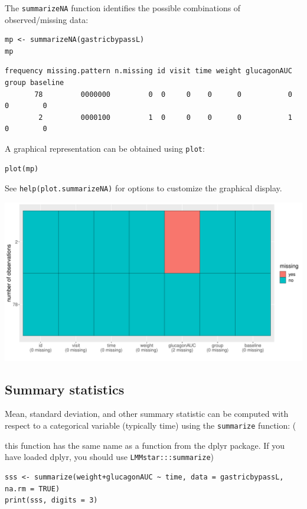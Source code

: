 \documentclass[12pt]{article}
\newcommand\Warning[1][3ex]{%
\renewcommand\stacktype{L}%
\scaleto{\stackon[1.3pt]{\color{red}$\triangle$}{\tiny\bfseries !}}{#1}%
\xspace
}
\begin{document}
The \texttt{summarizeNA} function identifies the possible combinations of
observed/missing data:
\lstset{language=r,label= ,caption= ,captionpos=b,numbers=none}
\begin{lstlisting}
mp <- summarizeNA(gastricbypassL)
mp
\end{lstlisting}

\begin{verbatim}
frequency missing.pattern n.missing id visit time weight glucagonAUC group baseline
       78         0000000         0  0     0    0      0           0     0        0
        2         0000100         1  0     0    0      0           1     0        0
\end{verbatim}


A graphical representation can be obtained using \texttt{plot}:
\lstset{language=r,label= ,caption= ,captionpos=b,numbers=none}
\begin{lstlisting}
plot(mp)
\end{lstlisting}

See \texttt{help(plot.summarizeNA)} for options to customize the graphical
display.

\begin{center}
\includegraphics[trim={0 0 0 0},width=1\textwidth]{./figures/summarizeNA.pdf}
\end{center}



\clearpage

\subsection{Summary statistics}
\label{sec:org4ef97bf}

Mean, standard deviation, and other summary statistic can be computed
with respect to a categorical variable (typically time) using the
\texttt{summarize} function: \newline (\Warning this function has the same
name as a function from the dplyr package. If you have loaded dplyr,
you should use \texttt{LMMstar:::summarize})
\lstset{language=r,label= ,caption= ,captionpos=b,numbers=none}
\begin{lstlisting}
sss <- summarize(weight+glucagonAUC ~ time, data = gastricbypassL, na.rm = TRUE)
print(sss, digits = 3)
\end{lstlisting}
\end{document}
